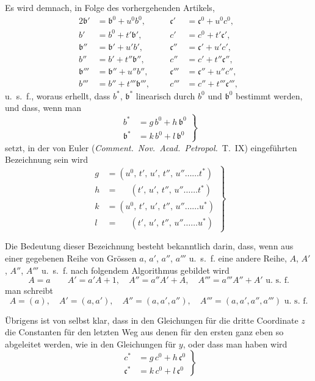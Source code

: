 \documentclass[11pt,a4paper]{article}
\begin{document}
Es wird demnach, in Folge des vorhergehenden Artikels,
\begin{alignat*}{2}
\mathfrak{b}' &= \mathfrak{b}^0 + u^0 b^0, \qquad & \mathfrak{c}' &= \mathfrak{c}^0 + u^0 c^0, \\
b' &= b^0 + t' \mathfrak{b}', & c' &= c^0 + t' \mathfrak{c}', \\
\mathfrak{b}'' &= \mathfrak{b}' + u' b', & \mathfrak{c}'' &= \mathfrak{c}' + u' c', \\
b'' &= b' + t'' \mathfrak{b}'', & c'' &= c' + t'' \mathfrak{c}'', \\
\mathfrak{b}''' &= \mathfrak{b}'' + u'' b'', & \mathfrak{c}''' &= \mathfrak{c}'' + u'' c'', \\
b''' &= b'' + t''' \mathfrak{b}''', & c''' &= c'' + t''' \mathfrak{c}''',
\end{alignat*}
u.~s.~f., woraus erhellt, dass $b^*$, $\mathfrak{b}^*$ linearisch durch $b^0$ und $\mathfrak{b}^0$ bestimmt werden, und dass, wenn man
\[
\left.
\begin{aligned}
b^* &= g\,b^0 + h\,\mathfrak{b}^0 \\
\mathfrak{b}^* &= k\,b^0 + l\,\mathfrak{b}^0
\end{aligned}
\right\} \tag{4}
\]
setzt, in der von Euler (\textit{Comment.\ Nov.\ Acad.\ Petropol.}\ T.~IX) eingeführten Bezeichnung sein wird
\[
\left.
\begin{aligned}
g &= (u^0,\, t',\, u',\, t'',\, u'' \ldots\ldots t^*) \\
h &= \quad\;\, (t',\, u',\, t'',\, u'' \ldots\ldots t^*) \\
k &= (u^0,\, t',\, u',\, t'',\, u'' \ldots\ldots u^*) \\
l &= \quad\;\, (t',\, u',\, t'',\, u'' \ldots\ldots u^*)
\end{aligned}
\right\} \tag{5}
\]

\newpage
\noindent
Die Bedeutung dieser Bezeichnung besteht bekanntlich darin, dass, wenn aus einer gegebenen Reihe von Grössen $a$, $a'$, $a''$, $a'''$ u.~s.~f. eine andere Reihe, $A$, $A'$, $A''$, $A'''$ u.~s.~f. nach folgendem Algorithmus gebildet wird
\[
A = a \qquad A' = a'A + 1, \quad A'' = a''A' + A, \quad A''' = a'''A'' + A' \text{ u.~s.~f.}
\]
man schreibt
\[
A = (a), \quad A' = (a, a'), \quad A'' = (a, a', a''), \quad A''' = (a, a', a'', a''') \text{ u.~s.~f.}
\]

Übrigens ist von selbst klar, dass in den Gleichungen für die dritte Coordinate $z$ die Constanten für den letzten Weg aus denen für den ersten ganz eben so abgeleitet werden, wie in den Gleichungen für $y$, oder dass man haben wird
\[
\left.
\begin{aligned}
c^* &= g\,c^0 + h\,\mathfrak{c}^0 \\
\mathfrak{c}^* &= k\,c^0 + l\,\mathfrak{c}^0
\end{aligned}
\right\} \tag{$4'$}
\]
\end{document}
